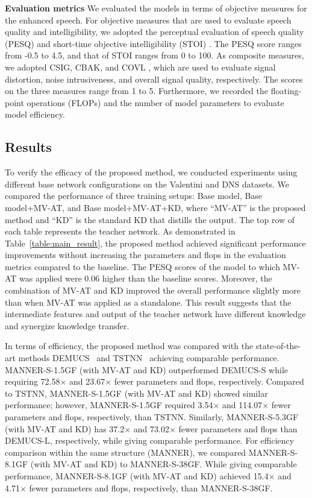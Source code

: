 \documentclass[a4paper]{article}
\begin{document}
\noindent\textbf{Evaluation metrics}
We evaluated the models in terms of objective measures for the enhanced speech. For objective measures that are used to evaluate speech quality and intelligibility, we adopted the perceptual evaluation of speech quality (PESQ) \cite{recommendation2001perceptual} and short-time objective intelligibility (STOI) \cite{taal2011algorithm}. The PESQ score ranges from -0.5 to 4.5, and that of STOI ranges from 0 to 100. As composite measures, we adopted CSIG, CBAK, and COVL \cite{hu2007evaluation}, which are used to evaluate signal distortion, noise intrusiveness, and overall signal quality, respectively. The scores on the three measures range from 1 to 5. Furthermore, we recorded the floating-point operations (FLOPs) and the number of model parameters to evaluate model efficiency.
\subsection{Results}
To verify the efficacy of the proposed method, we conducted experiments using different base network configurations on the Valentini and DNS datasets. We compared the performance of three training setups: Base model, Base model+MV-AT, and Base model+MV-AT+KD, where ``MV-AT'' is the proposed method and ``KD'' is the standard KD \cite{hinton2015distilling} that distills the output. The top row of each table represents the teacher network. As demonstrated in Table~\ref{table:main_result}, the proposed method achieved significant performance improvements without increasing the parameters and flops in the evaluation metrics compared to the baseline. The PESQ scores of the model to which MV-AT was applied were 0.06 higher than the baseline scores. Moreover, the combination of MV-AT and KD improved the overall performance slightly more than when MV-AT was applied as a standalone. This result suggests that the intermediate features and output of the teacher network have different knowledge and synergize knowledge transfer.

In terms of efficiency, the proposed method was compared with the state-of-the-art methods DEMUCS~\cite{defossez2020real} and TSTNN~\cite{wang2021tstnn} achieving comparable performance. MANNER-S-1.5GF (with MV-AT and KD) outperformed DEMUCS-S while requiring 72.58$\times$ and 23.67$\times$ fewer parameters and flops, respectively. Compared to TSTNN, MANNER-S-1.5GF (with MV-AT and KD) showed similar performance; however, MANNER-S-1.5GF required 3.54$\times$ and 114.07$\times$ fewer parameters and flops, respectively, than TSTNN. Similarly, MANNER-S-5.3GF (with MV-AT and KD) has 37.2$\times$ and 73.02$\times$ fewer parameters and flops than DEMUCS-L, respectively, while giving comparable performance. For efficiency comparison within the same structure (MANNER), we compared MANNER-S-8.1GF (with MV-AT and KD) to MANNER-S-38GF. While giving comparable performance, MANNER-S-8.1GF (with MV-AT and KD) achieved 15.4$\times$ and 4.71$\times$ fewer parameters and flops, respectively, than MANNER-S-38GF.
\end{document}
